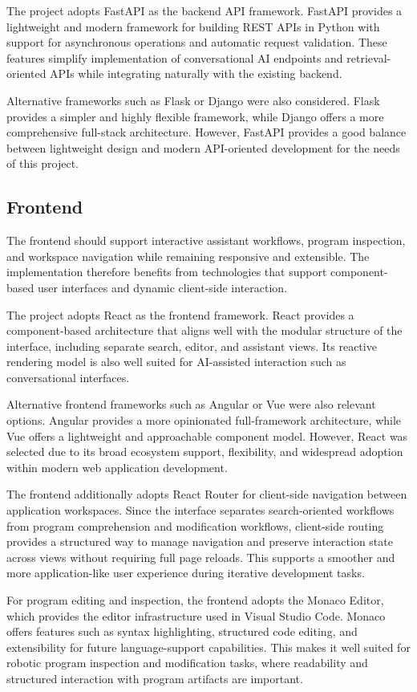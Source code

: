 The project adopts FastAPI as the backend API framework. FastAPI provides a lightweight and modern framework for building REST APIs in Python with support for asynchronous operations and automatic request validation. These features simplify implementation of conversational AI endpoints and retrieval-oriented APIs while integrating naturally with the existing backend.

Alternative frameworks such as Flask or Django were also considered. Flask provides a simpler and highly flexible framework, while Django offers a more comprehensive full-stack architecture. However, FastAPI provides a good balance between lightweight design and modern API-oriented development for the needs of this project.


\subsection{Frontend}
The frontend should support interactive assistant workflows, program inspection, and workspace navigation while remaining responsive and extensible. The implementation therefore benefits from technologies that support component-based user interfaces and dynamic client-side interaction.

The project adopts React as the frontend framework. React provides a component-based architecture that aligns well with the modular structure of the interface, including separate search, editor, and assistant views. Its reactive rendering model is also well suited for AI-assisted interaction such as conversational interfaces.

Alternative frontend frameworks such as Angular or Vue were also relevant options. Angular provides a more opinionated full-framework architecture, while Vue offers a lightweight and approachable component model. However, React was selected due to its broad ecosystem support, flexibility, and widespread adoption within modern web application development.

The frontend additionally adopts React Router for client-side navigation between application workspaces. Since the interface separates search-oriented workflows from program comprehension and modification workflows, client-side routing provides a structured way to manage navigation and preserve interaction state across views without requiring full page reloads. This supports a smoother and more application-like user experience during iterative development tasks.

For program editing and inspection, the frontend adopts the Monaco Editor, which provides the editor infrastructure used in Visual Studio Code. Monaco offers features such as syntax highlighting, structured code editing, and extensibility for future language-support capabilities. This makes it well suited for robotic program inspection and modification tasks, where readability and structured interaction with program artifacts are important.

